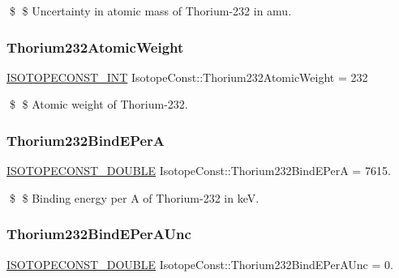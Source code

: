 \$ \$ Uncertainty in atomic mass of Thorium-\/232 in amu. \mbox{\label{group___isotope_const-_thorium-_th232_gac8649607f8f9e8851afaa4e3788253b0}} 
\subsubsection{\texorpdfstring{Thorium232\+Atomic\+Weight}{Thorium232AtomicWeight}}
{\footnotesize\ttfamily \mbox{\hyperlink{group___isotope_const-_macros_ga5f18360b3e99483a35c32d789e62621c}{I\+S\+O\+T\+O\+P\+E\+C\+O\+N\+S\+T\+\_\+\+I\+NT}} Isotope\+Const\+::\+Thorium232\+Atomic\+Weight = 232}

\$ \$ Atomic weight of Thorium-\/232. \mbox{\label{group___isotope_const-_thorium-_th232_gaa2411658be2eb93eceb96578c8fdc8d2}} 
\subsubsection{\texorpdfstring{Thorium232\+Bind\+E\+PerA}{Thorium232BindEPerA}}
{\footnotesize\ttfamily \mbox{\hyperlink{group___isotope_const-_macros_ga8f45a7272ce02c0b4c65c44636ed719a}{I\+S\+O\+T\+O\+P\+E\+C\+O\+N\+S\+T\+\_\+\+D\+O\+U\+B\+LE}} Isotope\+Const\+::\+Thorium232\+Bind\+E\+PerA = 7615.}

\$ \$ Binding energy per A of Thorium-\/232 in keV. \mbox{\label{group___isotope_const-_thorium-_th232_ga8e332639b5d5bdbdc798cebd0cc0b379}} 
\subsubsection{\texorpdfstring{Thorium232\+Bind\+E\+Per\+A\+Unc}{Thorium232BindEPerAUnc}}
{\footnotesize\ttfamily \mbox{\hyperlink{group___isotope_const-_macros_ga8f45a7272ce02c0b4c65c44636ed719a}{I\+S\+O\+T\+O\+P\+E\+C\+O\+N\+S\+T\+\_\+\+D\+O\+U\+B\+LE}} Isotope\+Const\+::\+Thorium232\+Bind\+E\+Per\+A\+Unc = 0.}


